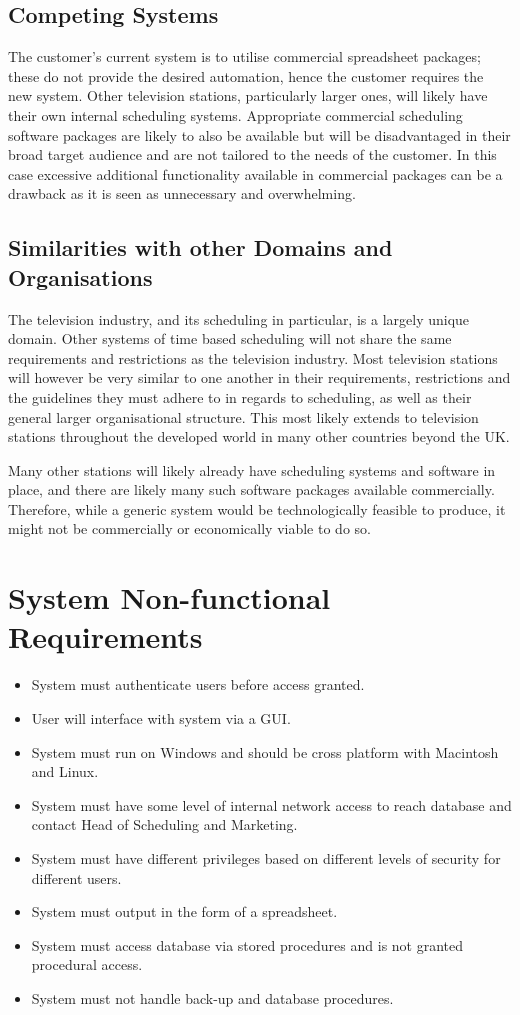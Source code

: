 \documentclass[11pt, oneside]{article}
\begin{document}
\subsection{Competing Systems}
The customer's current system is to utilise commercial spreadsheet packages; these do not provide the desired automation, hence the customer requires the new system. Other television stations, particularly larger ones, will likely have their own internal scheduling systems. Appropriate commercial scheduling software packages are likely to also be available but will be disadvantaged in their broad target audience and are not tailored to the needs of the customer. In this case excessive additional functionality available in commercial packages can be a drawback as it is seen as unnecessary and overwhelming.
\subsection{Similarities with other Domains and Organisations}
The television industry, and its scheduling in particular, is a largely unique domain. Other systems of time based scheduling will not share the same requirements and restrictions as the television industry. Most television stations will however be very similar to one another in their requirements, restrictions and the guidelines they must adhere to in regards to scheduling, as well as their general larger organisational structure. This most likely extends to television stations throughout the developed world in many other countries beyond the UK.

Many other stations will likely already have scheduling systems and software in place, and there are likely many such software packages available commercially. Therefore, while a generic system would be technologically feasible to produce, it might not be commercially or economically viable to do so.
\section{System Non-functional Requirements}
\begin{itemize}
\item System must authenticate users before access granted.
\item User will interface with system via a GUI.
\item System must run on Windows and should be cross platform with Macintosh and Linux.
\item System must have some level of internal network access to reach database and contact Head of Scheduling and Marketing.
\item System must have different privileges based on different levels of security for different users.
\item System must output in the form of a spreadsheet.
\item System must access database via stored procedures and is not granted procedural access.
\item System must not handle back-up and database procedures.
\end{itemize}
\end{document}
